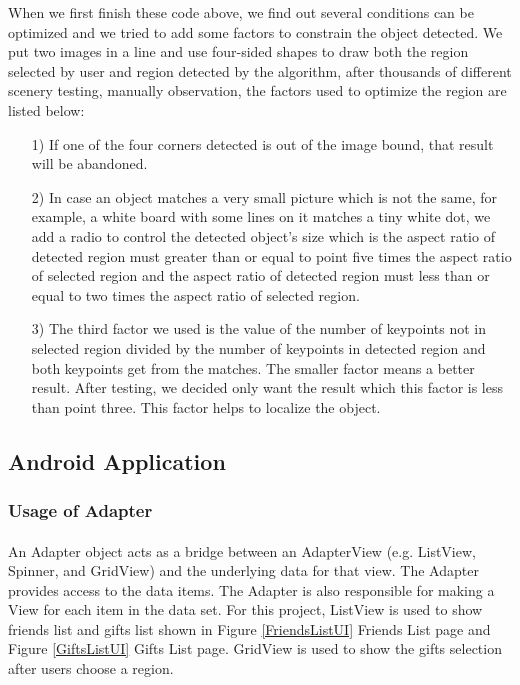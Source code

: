 \par When we first finish these code above, we find out several conditions can be optimized and we tried to add some factors to constrain the object detected. We put two images in a line and use four-sided shapes to draw both the region selected by user and region detected by the algorithm, after thousands of different scenery testing, manually observation, the factors used to optimize the region are listed below:
\begin{enumerate}
\item[1)] If one of the four corners detected is out of the image bound, that result will be abandoned. 
\item[2)] In case an object matches a very small picture which is not the same, for example, a white board with some lines on it matches a tiny white dot, we add a radio to control the detected object's size which is the aspect ratio of detected region must greater than or equal to point five times the aspect ratio of selected region and the aspect ratio of detected region must less than or equal to two times the aspect ratio of selected region.
\item[3)] The third factor we used is the value of the number of keypoints not in selected region divided by the number of keypoints in detected region and both keypoints get from the matches. The smaller factor means a better result. After testing, we decided only want the result which this factor is less than point three. This factor helps to localize the object.
\end{enumerate}

\subsection{Android Application}
\subsubsection{Usage of Adapter}
\paragraph{}
An Adapter object acts as a bridge between an AdapterView (e.g. ListView, Spinner, and GridView) and the underlying data for that view. The Adapter provides access to the data items. The Adapter is also responsible for making a View for each item in the data set. For this project, ListView is used to show friends list and gifts list shown in Figure \ref{FriendsListUI} Friends List page and Figure \ref{GiftsListUI} Gifts List page. GridView is used to show the gifts selection after users choose a region. 


